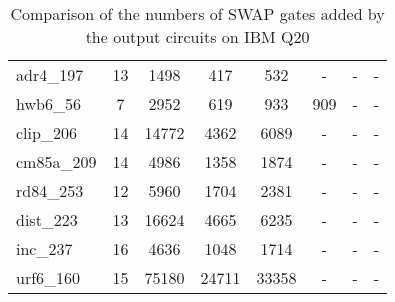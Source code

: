 \documentclass[journal]{IEEEtran}
\begin{document}
\begin{table*}[htbp]
\begin{center}
\begin{tabular}{|p{4.3cm}<{\centering}|c|c|c|c|c|c|c|}
            adr4\_197 & 13 & 1498 & 417 & 532 & - & - & - \\ 
            hwb6\_56 & 7 & 2952 & 619 & 933 & 909 & - & - \\ 
            clip\_206 & 14 & 14772 & 4362 & 6089 & - & - & - \\ 
            cm85a\_209 & 14 & 4986 & 1358 & 1874 & - & - & - \\ 
            rd84\_253 & 12 & 5960 & 1704 & 2381 & - & - & - \\ 
            dist\_223 & 13 & 16624 & 4665 & 6235 & - & - & - \\ 
            inc\_237 & 16 & 4636 & 1048 & 1714 & - & - & - \\ 
            urf6\_160 & 15 & 75180 & 24711 & 33358 & - & - & - \\ 
            \hline
            \end{tabular} 
            \end{center}	
            \caption{Comparison of  the numbers of SWAP gates added by the 
            output circuits on IBM Q20 }
            \label{tab5}  
            \end{table*}
              
\end{document}
